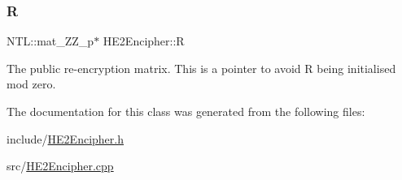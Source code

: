 \subsubsection{\texorpdfstring{R}{R}}
{\footnotesize\ttfamily N\+T\+L\+::mat\+\_\+\+Z\+Z\+\_\+p$\ast$ H\+E2\+Encipher\+::R\hspace{0.3cm}{\ttfamily [protected]}}

The public re-\/encryption matrix. This is a pointer to avoid R being initialised mod zero. 

The documentation for this class was generated from the following files\+:\begin{DoxyCompactItemize}
\item 
include/\hyperlink{HE2Encipher_8h}{H\+E2\+Encipher.\+h}\item 
src/\hyperlink{HE2Encipher_8cpp}{H\+E2\+Encipher.\+cpp}\end{DoxyCompactItemize}
